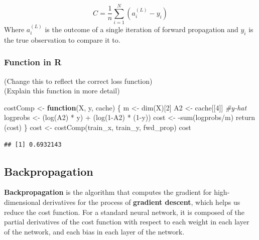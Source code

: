 \documentclass[
]{article}
\newenvironment{Shaded}{\begin{snugshade}}{\end{snugshade}}
\newcommand{\CommentTok}[1]{\textcolor[rgb]{0.56,0.35,0.01}{\textit{#1}}}
\newcommand{\ControlFlowTok}[1]{\textcolor[rgb]{0.13,0.29,0.53}{\textbf{#1}}}
\newcommand{\DecValTok}[1]{\textcolor[rgb]{0.00,0.00,0.81}{#1}}
\newcommand{\FunctionTok}[1]{\textcolor[rgb]{0.00,0.00,0.00}{#1}}
\newcommand{\NormalTok}[1]{#1}
\newcommand{\OtherTok}[1]{\textcolor[rgb]{0.56,0.35,0.01}{#1}}
\newcommand{\SpecialCharTok}[1]{\textcolor[rgb]{0.00,0.00,0.00}{#1}}
\begin{document}
\[
C = \frac{1}{n} \sum_{i=1}^N (a^{(L)}_i - y_i)
\] Where \(a^{(L)}_i\) is the outcome of a single iteration of forward
propagation and \(y_i\) is the true observation to compare it to.

\hypertarget{function-in-r-3}{%
\subsubsection{Function in R}\label{function-in-r-3}}

(Change this to reflect the correct loss function)\\
(Explain this function in more detail)

\begin{Shaded}
\begin{Highlighting}[]
\NormalTok{costComp }\OtherTok{\textless{}{-}} \ControlFlowTok{function}\NormalTok{(X, y, cache) \{}
\NormalTok{  m }\OtherTok{\textless{}{-}} \FunctionTok{dim}\NormalTok{(X)[}\DecValTok{2}\NormalTok{]}
\NormalTok{  A2 }\OtherTok{\textless{}{-}}\NormalTok{ cache[[}\DecValTok{4}\NormalTok{]]  }\CommentTok{\#y{-}hat}
\NormalTok{  logprobs }\OtherTok{\textless{}{-}}\NormalTok{ (}\FunctionTok{log}\NormalTok{(A2) }\SpecialCharTok{*}\NormalTok{ y) }\SpecialCharTok{+}\NormalTok{ (}\FunctionTok{log}\NormalTok{(}\DecValTok{1}\SpecialCharTok{{-}}\NormalTok{A2) }\SpecialCharTok{*}\NormalTok{ (}\DecValTok{1}\SpecialCharTok{{-}}\NormalTok{y))}
\NormalTok{  cost }\OtherTok{\textless{}{-}} \SpecialCharTok{{-}}\FunctionTok{sum}\NormalTok{(logprobs}\SpecialCharTok{/}\NormalTok{m)}
  \FunctionTok{return}\NormalTok{ (cost)}
\NormalTok{\}}
\NormalTok{cost }\OtherTok{\textless{}{-}} \FunctionTok{costComp}\NormalTok{(train\_x, train\_y, fwd\_prop)}
\NormalTok{cost}
\end{Highlighting}
\end{Shaded}

\begin{verbatim}
## [1] 0.6932143
\end{verbatim}

\hypertarget{backpropagation}{%
\subsection{Backpropagation}\label{backpropagation}}

\textbf{Backpropagation} is the algorithm that computes the gradient for
high-dimensional derivatives for the process of \textbf{gradient
descent}, which helps us reduce the cost function. For a standard neural
network, it is composed of the partial derivatives of the cost function
with respect to each weight in each layer of the network, and each bias
in each layer of the network.
\end{document}
